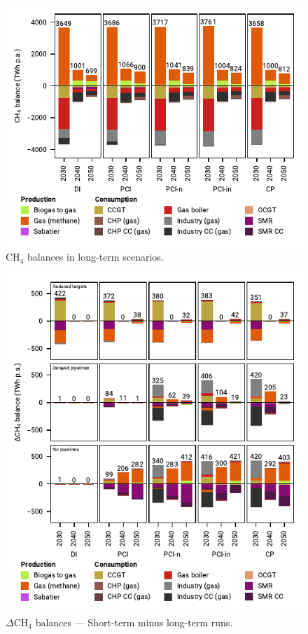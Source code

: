 \documentclass[pdflatex,sn-nature]{sn-jnl}%
\theoremstyle{thmstyleone}%
\theoremstyle{thmstyletwo}%
\theoremstyle{thmstylethree}%
\begin{document}
\begin{appendices}
\begin{figure}[htbp]
  \centering
  \includegraphics{figures/balances_overview_gas}
  \caption{CH$_4$ balances in long-term scenarios.}
  \label{fig:balances_overview_gas}
\end{figure}

\begin{figure}[htbp]
  \centering
  \includegraphics{figures/balances_overview_extended_gas}
  \caption{$\Delta$CH$_4$ balances --- Short-term minus long-term runs.}
  \label{fig:balances_overview_extended_gas}
\end{figure}


\end{appendices}
\end{document}
